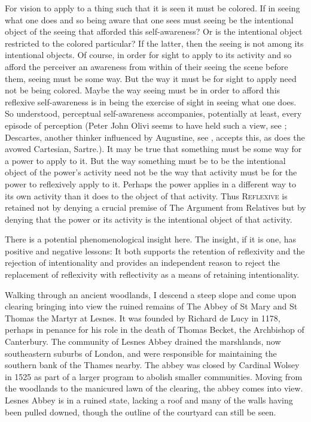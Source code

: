 For vision to apply to a thing such that it is seen it must be colored. If in seeing what one does and so being aware that one sees must seeing be the intentional object of the seeing that afforded this self-awareness? Or is the intentional object restricted to the colored particular? If the latter, then the seeing is not among its intentional objects. Of course, in order for sight to apply to its activity and so afford the perceiver an awareness from within of their seeing the scene before them, seeing must be some way. But the way it must be for sight to apply need not be being colored. Maybe the way seeing must be in order to afford this reflexive self-awareness is in being the exercise of sight in seeing what one does. So understood, perceptual self-awareness accompanies, potentially at least, every episode of perception (Peter John Olivi seems to have held such a view, see \citealt{Brower-Toland:2024qa}; Descartes, another thinker influenced by Augustine, see \citealt{Menn:1998nr}, accepts this, as does the avowed Cartesian, Sartre.). It may be true that something must be some way for a power to apply to it. But the way something must be to be the intentional object of the power's activity need not be the way that activity must be for the power to reflexively apply to it. Perhaps the power applies in a different way to its own activity than it does to the object of that activity. Thus \textsc{Reflexive} is retained not by denying a crucial premise of The Argument from Relatives but by denying that the power or its activity is the intentional object of that activity.

There is a potential phenomenological insight here. The insight, if it is one, has positive and negative lessons: It both supports the retention of reflexivity and the rejection of intentionality and provides an independent reason to reject the replacement of reflexivity with reflectivity as a means of retaining intentionality. 

Walking through an ancient woodlands, I descend a steep slope and come upon clearing bringing into view the ruined remains of The Abbey of St Mary and St Thomas the Martyr at Lesnes. It was founded by Richard de Lucy in 1178, perhaps in penance for his role in the death of Thomas Becket, the Archbishop of Canterbury. The community of Lesnes Abbey drained the marshlands, now southeastern suburbs of London, and were responsible for maintaining the southern bank of the Thames nearby. The abbey was closed by Cardinal Wolsey in 1525 as part of a larger program to abolish smaller communities. Moving from the woodlands to the manicured lawn of the clearing, the abbey comes into view. Lesnes Abbey is in a ruined state, lacking a roof and many of the walls having been pulled downed, though the outline of the courtyard can still be seen.

